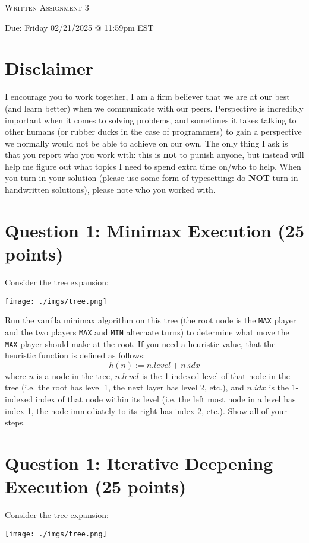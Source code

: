 \documentclass[11pt]{article}
\newcommand{\question}[1]{\section*{\normalsize #1}}
\begin{document}
\begin{center}
    {\Large \textsc{Written Assignment 3}}
\end{center}
\begin{center}
    Due: Friday 02/21/2025 @ 11:59pm EST
\end{center}

\section*{\textbf{Disclaimer}}
I encourage you to work together, I am a firm believer that we are at our best (and learn better) when we communicate with our peers. Perspective is incredibly important when it comes to solving problems, and sometimes it takes talking to other humans (or rubber ducks in the case of programmers) to gain a perspective we normally would not be able to achieve on our own. The only thing I ask is that you report who you work with: this is \textbf{not} to punish anyone, but instead will help me figure out what topics I need to spend extra time on/who to help. When you turn in your solution (please use some form of typesetting: do \textbf{NOT} turn in handwritten solutions), please note who you worked with.\newline



\question{Question 1: Minimax Execution  (25 points)}
Consider the tree expansion:

\texttt{[image: ./imgs/tree.png]}

\noindent Run the vanilla minimax algorithm on this tree (the root node is the \texttt{MAX} player and the two players \texttt{MAX} and \texttt{MIN} alternate turns) to determine what move the \texttt{MAX} player should make at the root. If you need a heuristic value, that the heuristic function is defined as follows:
$$h(n) := n.level + n.idx$$
where $n$ is a node in the tree, $n.level$ is the 1-indexed level of that node in the tree (i.e. the root has level 1, the next layer has level 2, etc.), and $n.idx$ is the 1-indexed index of that node within its level (i.e. the left most node in a level has index 1, the node immediately to its right has index 2, etc.). Show all of your steps.
\newpage



\question{Question 1: Iterative Deepening Execution  (25 points)}
Consider the tree expansion:

\texttt{[image: ./imgs/tree.png]}
\end{document}
